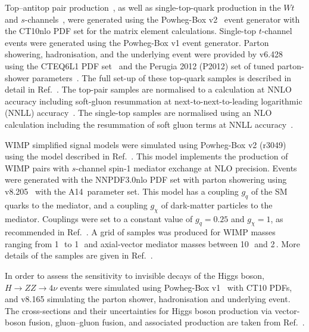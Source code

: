 \documentclass[cernpreprint,txfonts,UKenglish,texlive=2016]{\ATLASLATEXPATH atlasdoc}
\begin{document}
Top--antitop pair production~\cite{Alioli:2011as}, as well as single-top-quark production
in the $Wt$~\cite{Re:2010bp} and $s$-channels~\cite{Frederix:2012dh,Alioli:2009je}, were generated using the 
Powheg-Box v2~\cite{Frixione:2007vw,Nason:2004rx,Frixione:2007nw} event generator with the CT10nlo PDF set for the matrix element 
calculations. Single-top $t$-channel events were generated using the Powheg-Box v1 event generator. 
Parton showering, hadronisation, and the underlying event were provided by \pythia{} v6.428~\cite{Sjostrand:2006za} using the 
CTEQ6L1 PDF set~\cite{Pumplin:2002vw} and the Perugia 2012 (P2012) set of tuned parton-shower parameters~\cite{Skands:2010ak}. 
The full set-up of these top-quark samples is described in detail in Ref.~\cite{ATL-PHYS-PUB-2016-004}.
The top-pair samples are normalised to a calculation at NNLO accuracy including soft-gluon resummation at next-to-next-to-leading 
logarithmic (NNLL) accuracy~\cite{Czakon:2011xx}.
The single-top samples are normalised using an NLO calculation including the resummation of soft gluon terms at
NNLL accuracy~\cite{Kidonakis:2010ux,Kidonakis:2010tc,Kidonakis:2011wy}.

WIMP simplified signal models were simulated using Powheg-Box v2 (r3049) using the model described 
in Ref.~\cite{Haisch:2013ata}.
This model implements the production of WIMP pairs with $s$-channel spin-1 mediator exchange at NLO precision.
Events were generated with the NNPDF3.0nlo PDF set with parton showering using \pythia{} v8.205~\cite{Sjostrand:2014zea} with 
the A14\,\cite{ATL-PHYS-PUB-2014-021} parameter set.
This model has a coupling $g_q$ of the SM quarks to the mediator, and a coupling $g_{\chi}$ of dark-matter particles to the mediator.
Couplings were set to a constant value of $g_q = 0.25$ and $g_{\chi}=1$, as recommended in Ref.~\cite{Abercrombie:2015wmb}.
A grid of samples was produced
for WIMP masses ranging from 1\,\GeV\ to 1\,\TeV\ and axial-vector mediator masses
between 10\,\GeV\ and 2\,\TeV.
More details of the samples are given in Ref.~\cite{EXOT-2015-03}.

In order to assess the sensitivity to invisible decays of the Higgs boson, $H \to ZZ \to 4\nu$ events were 
simulated using Powheg-Box v1~\cite{Alioli:2008tz,Nason:2009ai,Bagnaschi:2011tu} with
CT10 PDFs, and \pythia{} v8.165 simulating the parton shower, hadronisation and underlying
event. The cross-sections and their uncertainties for Higgs boson
production via vector-boson fusion, gluon--gluon fusion, and associated production
are taken from Ref.~\cite{Heinemeyer:2013tqa}. 
\end{document}
